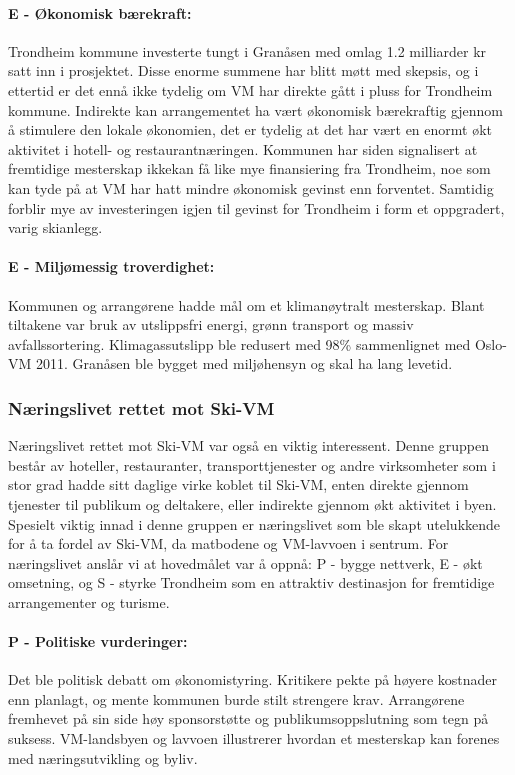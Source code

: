 \paragraph{E - Økonomisk bærekraft:} Trondheim kommune investerte tungt i Granåsen med omlag 1.2 
milliarder kr satt inn i prosjektet\parencite{NRK12Milliarder}. Disse enorme summene har blitt møtt med skepsis, og i ettertid er det ennå ikke tydelig om VM har direkte gått i pluss for Trondheim kommune\parencite{AftenpostenNyVM}. Indirekte kan arrangementet ha vært økonomisk bærekraftig gjennom å stimulere den lokale økonomien, det er tydelig at det har vært en enormt økt aktivitet i hotell- og
restaurantnæringen\parencite{DagbladetPriser}. Kommunen har siden signalisert at fremtidige mesterskap ikkekan få like mye finansiering fra Trondheim\parencite{NeaRadioVM}, noe som kan tyde på at VM har hatt mindre økonomisk gevinst enn forventet. Samtidig forblir mye av investeringen igjen til gevinst for Trondheim i form et oppgradert, varig skianlegg.

\paragraph{E - Miljømessig troverdighet:} Kommunen og arrangørene hadde mål om et klimanøytralt 
mesterskap\parencite{TrondheimKommuneVM}. Blant tiltakene var bruk av utslippsfri energi, grønn 
transport og massiv avfallssortering. Klimagassutslipp ble redusert med 98\% sammenlignet 
med Oslo-VM 2011\parencite{Trondheim2025Kutt}. Granåsen ble bygget med miljøhensyn og skal ha lang levetid. 


\subsubsection{Næringslivet rettet mot Ski-VM}
Næringslivet rettet mot Ski-VM var også en viktig interessent. Denne gruppen består av 
hoteller, restauranter, transporttjenester og andre virksomheter som i stor grad hadde sitt 
daglige virke koblet til Ski-VM, enten direkte gjennom tjenester til publikum og deltakere, 
eller indirekte gjennom økt aktivitet i byen. Spesielt viktig innad i denne gruppen er 
næringslivet som ble skapt utelukkende for å ta fordel av Ski-VM, da matbodene og VM-lavvoen 
i sentrum. For næringslivet anslår vi at hovedmålet var å oppnå: P - bygge nettverk, E - økt omsetning, og S - styrke Trondheim som en attraktiv destinasjon for fremtidige arrangementer og turisme.

\paragraph{P - Politiske vurderinger:}
Det ble politisk debatt om økonomistyring. Kritikere pekte på høyere kostnader enn planlagt, og mente kommunen burde stilt strengere krav\parencite{nettavisenKritikk}. Arrangørene fremhevet på sin side høy sponsorstøtte og publikumsoppslutning som tegn på suksess\parencite{kom24Sponsorsalg}. VM-landsbyen og lavvoen illustrerer hvordan et mesterskap kan forenes med næringsutvikling og byliv.

